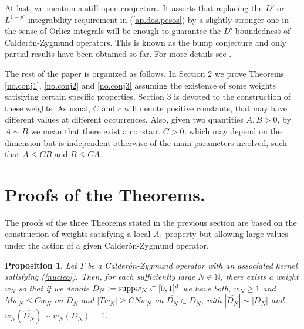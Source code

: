 \documentclass[11pt]{amsart}
\newtheorem{prop}[teo]{Proposition}
\theoremstyle{definition}
\begin{document}
\bigskip

At last, we mention a still open conjecture. It asserts that replacing the $L^p$ or $L^{1-p'}$ integrability requirement in (\ref{ap.dos.pesos}) by a slightly stronger one in the sense of Orlicz integrals will be enough to guarantee the $L^p$ boundedness of Calder\'on-Zygmund operators. This is known as the bump conjecture and only partial results have been obtained so far. For more details see \cite{CUMP1, CUMP2, CUMP3, CUCP1, CUCP2, CUCP3, CUCP4, CURV, Lerner, NazarovReznikovVolberg, Perez0, Perez1, Perez3, PerezWheeden, TreilVolbergZheng}. 

\bigskip

The rest of the paper is organized as follows. In Section 2 we prove Theorems \ref{no.conj1}, \ref{no.conj2} and \ref{no.conj3} assuming the existence of some weights satisfying certain specific properties. Section 3 is devoted to the construction of these weights. As usual, $C$ and $c$ will denote positive constants, that may have different values at different occurrences. Also, given two quantities $A,B>0$, by $A\sim B$ we mean that there exist a constant $C>0$, which may depend on the dimension but is independent otherwise of the main parameters involved, such that $A\leq CB$ and $B\leq CA$.

\bigskip

\section{Proofs of the Theorems.}

\bigskip

The proofs of the three Theorems stated in the previous section are based on the construction of weights satisfying a local $A_1$ property but allowing large values under the action of a given Calder\'on-Zygmund operator.

\bigskip

\begin{prop}\label{prop.pesos} Let $T$ be a Calder\'on-Zygmund operator with an associated kernel satisfying (\ref{nucleo}). Then, for each sufficiently large $N\in \mathbb N$, there exists a weight $w_N$ so that if we denote $D_N:={\mathop{\mbox{\normalfont supp}}\nolimits} w_N\subset [0,1]^d$ we have both, $w_N\geq 1$ and  $Mw_N\leq C w_N$ on $D_N$ and $|T w_N|\geq CN w_N$ on $\widehat{D_N} \subset D_N$, with $|\widehat{D_N}|\sim |D_N|$ and $w_N(\widehat{D_N})\sim w_N(D_N)=1$.
\end{prop}

\bigskip
\end{document}
